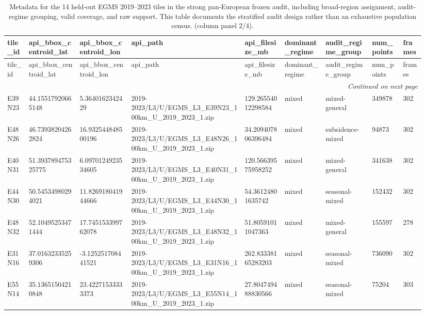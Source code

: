 \begin{landscape}
\scriptsize
\setlength{\LTleft}{0pt}
\setlength{\LTright}{0pt}
\begin{longtable}{lllllllll}
\caption{Metadata for the 14 held-out EGMS 2019--2023 tiles in the strong pan-European frozen audit, including broad-region assignment, audit-regime grouping, valid coverage, and raw support. This table documents the stratified audit design rather than an exhaustive population census. (column panel 2/4).}\label{tab:e7_strong_tile_metadata_part2}\\
\toprule
tile\_id & api\_bbox\_centroid\_lat & api\_bbox\_centroid\_lon & api\_path & api\_filesize\_mb & dominant\_regime & audit\_regime\_group & num\_points & frames \\
\midrule
\endfirsthead
\toprule
tile\_id & api\_bbox\_centroid\_lat & api\_bbox\_centroid\_lon & api\_path & api\_filesize\_mb & dominant\_regime & audit\_regime\_group & num\_points & frames \\
\midrule
\endhead
\midrule
\multicolumn{9}{r}{\textit{Continued on next page}} \\
\endfoot
\bottomrule
\endlastfoot
E39N23 & 44.15517920665148 & 5.3640162342429 & 2019-2023/L3/U/EGMS\_L3\_E39N23\_100km\_U\_2019\_2023\_1.zip & 129.26554012298584 & mixed & mixed-general & 349878 & 302 \\
E48N26 & 46.73938204262824 & 16.932544848500196 & 2019-2023/L3/U/EGMS\_L3\_E48N26\_100km\_U\_2019\_2023\_1.zip & 34.209407806396484 & mixed & subsidence-mixed & 94873 & 302 \\
E40N31 & 51.393789475325775 & 6.0970124923534605 & 2019-2023/L3/U/EGMS\_L3\_E40N31\_100km\_U\_2019\_2023\_1.zip & 120.56639575958252 & mixed & mixed-general & 341638 & 302 \\
E44N30 & 50.54534980294021 & 11.826918041944666 & 2019-2023/L3/U/EGMS\_L3\_E44N30\_100km\_U\_2019\_2023\_1.zip & 54.36124801635742 & mixed & seasonal-mixed & 152432 & 302 \\
E48N32 & 52.10495253471444 & 17.745153399762078 & 2019-2023/L3/U/EGMS\_L3\_E48N32\_100km\_U\_2019\_2023\_1.zip & 51.80591011047363 & mixed & mixed-general & 155597 & 278 \\
E31N16 & 37.01632335259306 & -3.125251708441521 & 2019-2023/L3/U/EGMS\_L3\_E31N16\_100km\_U\_2019\_2023\_1.zip & 262.83338165283203 & mixed & seasonal-mixed & 736090 & 302 \\
E55N14 & 35.13651504210848 & 23.42271533333373 & 2019-2023/L3/U/EGMS\_L3\_E55N14\_100km\_U\_2019\_2023\_1.zip & 27.804749488830566 & mixed & seasonal-mixed & 75204 & 303 \\

\end{longtable}
\end{landscape}
